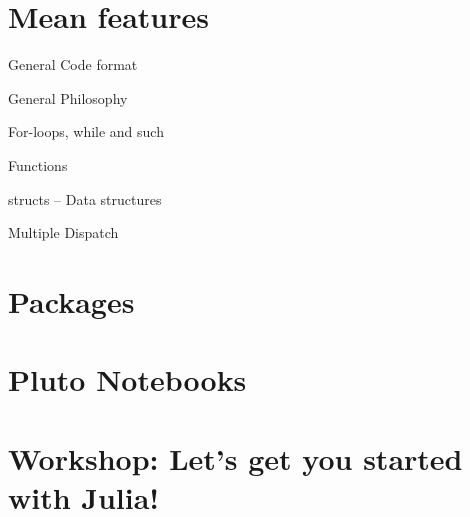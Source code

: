 \documentclass[aspectratio=169, handout]{beamer}
\begin{document}
    \section{Mean features}
    \begin{frame}{General Code format}

    \end{frame}
    \begin{frame}{General Philosophy}

    \end{frame}
    \begin{frame}{For-loops, while and such}

    \end{frame}
    \begin{frame}{Functions}

    \end{frame}
    \begin{frame}{structs – Data structures}

    \end{frame}
    \begin{frame}{Multiple Dispatch}

    \end{frame}
    \section{Packages}
    \section{Pluto Notebooks}
    \section{Workshop: Let's get you started with Julia!}
\end{document}

